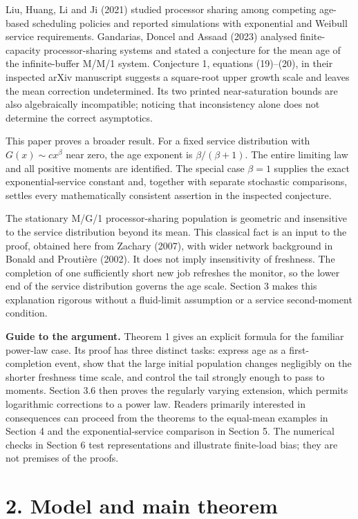 \documentclass[
  11pt,
  a4paper,
]{scrartcl}
\begin{document}
Liu, Huang, Li and Ji (2021) studied processor sharing among competing
age-based scheduling policies and reported simulations with exponential
and Weibull service requirements. Gandarias, Doncel and Assaad (2023)
analysed finite-capacity processor-sharing systems and stated a
conjecture for the mean age of the infinite-buffer M/M/1 system.
Conjecture 1, equations (19)--(20), in their inspected arXiv manuscript
suggests a square-root upper growth scale and leaves the mean correction
undetermined. Its two printed near-saturation bounds are also
algebraically incompatible; noticing that inconsistency alone does not
determine the correct asymptotics.

This paper proves a broader result. For a fixed service distribution
with \(G(x)\sim cx^\beta\) near zero, the age exponent is
\(\beta/(\beta+1)\). The entire limiting law and all positive moments
are identified. The special case \(\beta=1\) supplies the exact
exponential-service constant and, together with separate stochastic
comparisons, settles every mathematically consistent assertion in the
inspected conjecture.

The stationary M/G/1 processor-sharing population is geometric and
insensitive to the service distribution beyond its mean. This classical
fact is an input to the proof, obtained here from Zachary (2007), with
wider network background in Bonald and Proutière (2002). It does not
imply insensitivity of freshness. The completion of one sufficiently
short new job refreshes the monitor, so the lower end of the service
distribution governs the age scale. Section 3 makes this explanation
rigorous without a fluid-limit assumption or a service second-moment
condition.

\textbf{Guide to the argument.} Theorem 1 gives an explicit formula for
the familiar power-law case. Its proof has three distinct tasks: express
age as a first-completion event, show that the large initial population
changes negligibly on the shorter freshness time scale, and control the
tail strongly enough to pass to moments. Section 3.6 then proves the
regularly varying extension, which permits logarithmic corrections to a
power law. Readers primarily interested in consequences can proceed from
the theorems to the equal-mean examples in Section 4 and the
exponential-service comparison in Section 5. The numerical checks in
Section 6 test representations and illustrate finite-load bias; they are
not premises of the proofs.

\section{2. Model and main theorem}\label{model-and-main-theorem}
\end{document}
